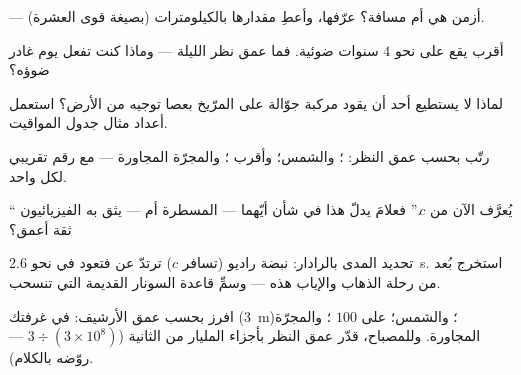 \begin{exercise}[$\star$]\label{exo:g8:speed-of-light:4}
 --- أزمن هي أم مسافة؟ عرّفها، وأعطِ مقدارها
بالكيلومترات (بصيغة قوى العشرة).
\end{exercise}

\begin{exercise}[$\star$]\label{exo:g8:speed-of-light:5}
أقرب  يقع على نحو $4$ سنوات ضوئية. فما عمق نظر الليلة ---
وماذا كنت تفعل يوم غادر ضوؤه؟
\end{exercise}

\begin{exercise}[$\star$]\label{exo:g8:speed-of-light:6}
لماذا لا يستطيع أحد أن يقود مركبة جوّالة على المرّيخ بعصا
توجيه من الأرض؟ استعمل أعداد مثال جدول المواقيت.
\end{exercise}

\begin{exercise}[$\star$]\label{exo:g8:speed-of-light:7}
رتّب بحسب عمق النظر: ؛ والشمس؛ وأقرب ؛ والمجرّة
المجاورة --- مع رقم تقريبي لكل واحد.
\end{exercise}

\begin{exercise}[$\star$]\label{exo:g8:speed-of-light:8}
`` يُعرَّف الآن من $c$.'' فعلامَ يدلّ هذا في شأن أيّهما
--- المسطرة أم  --- يثق به الفيزيائيون ثقة أعمق؟
\end{exercise}

\begin{exercise}[$\star\star$]\label{exo:g8:speed-of-light:9}
تحديد المدى بالرادار: نبضة راديو (تسافر  $c$) ترتدّ عن
 فتعود في نحو \qty{2.6}{s}. استخرج بُعد  من رحلة
الذهاب والإياب هذه --- وسمِّ قاعدة السونار القديمة التي
تنسحب.
\end{exercise}

\begin{exercise}[$\star\star$]\label{exo:g8:speed-of-light:10}
افرز بحسب عمق الأرشيف:   في غرفتك (\qty{3}{m})؛
والشمس؛  على $100$ ؛ والمجرّة المجاورة. وللمصباح،
قدّر عمق النظر بأجزاء المليار من الثانية
($3 \div (3 \times 10^{8})$ --- روّضه بالكلام).
\end{exercise}

